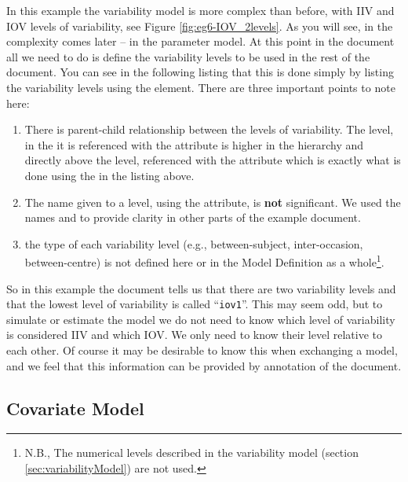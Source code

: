 In this example the variability model is more complex than before, with IIV and IOV levels of variability, see Figure \ref{fig:eg6-IOV_2levels}. As you will see, in \pharmml the complexity comes later -- in the parameter model. At this point in the \pharmml document all we need to do is define the variability levels to be used in the rest of the document. You can see in the following listing 
that this is done simply by listing the variability levels using the  element. There are three important points to note here:
\begin{enumerate}
\item There is parent-child relationship between the levels of variability. The  level, 
in the \pharmml it is referenced with the attribute  is higher
in the hierarchy and directly above the  level, referenced with the 
attribute  which is exactly what is done
using the  in the listing above.
\item The name given to a level, using the  attribute, is \textbf{not} significant. We used the names  and  to provide clarity in other parts of the example document.
\item the type of each variability level (e.g.,\xspace between-subject, inter-occasion, between-centre) is not defined here or in the Model Definition as a whole\footnote{N.B.,\xspace The numerical levels described in the variability model (section \ref{sec:variabilityModel}) are not used.}.
\end{enumerate}

So in this example the \pharmml document tells us that there are two variability levels and that the lowest level of variability is called ``\texttt{iov1}''\@. This may seem odd, but to simulate or estimate the model we do not need to know which level of variability is considered IIV and which IOV.  We only need to know their level relative to each other. Of course it may be desirable to know this when exchanging  a model, and we feel that this information can be provided by annotation of the \pharmml document.


\subsection{Covariate Model}

